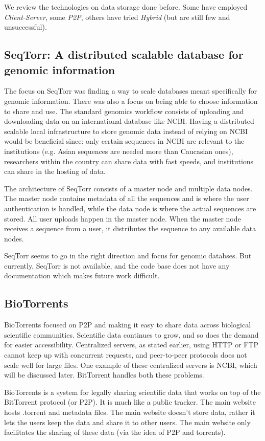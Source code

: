 \documentclass[acmsmall]{acmart}
\begin{document}
We review the technologies on data storage done before. Some have employed \textit{Client-Server}, some \textit{P2P}, others have tried \textit{Hybrid} (but are still few and unsuccessful).

\subsection{SeqTorr: A distributed scalable database for genomic information}
The focus on SeqTorr was finding a way to scale databases meant specifically for genomic information. There was also a focus on being able to choose information to share and use. The standard genomics workflow consists of uploading and downloading data on an international database like NCBI. Having a distributed scalable local infrastructure to store genomic data instead of relying on NCBI would be beneficial since: only certain sequences in NCBI are relevant to the institutions (e.g. Asian sequences are needed more than Caucasian ones), researchers within the country can share data with fast speeds, and  institutions can share in the hosting of data.

The architecture of SeqTorr consists of a master node and multiple data nodes. The master node contains metadata of all the sequences and is where the user authentication is handled, while the data node is where the actual sequences are stored. All user uploads happen in the master node. When the master node receives a sequence from a user, it distributes the sequence to any available data nodes. 
\cite{seqtorr}

SeqTorr seems to go in the right direction and focus for genomic databses. But currently, SeqTorr is not available, and the code base does not have any documentation which makes future work difficult.

\subsection{BioTorrents}
BioTorrents focused on P2P and making it easy to share data across biological scientific communities.  Scientific data continues to grow, and so does the demand for easier accessibility. Centralized servers, as stated earlier, using HTTP or FTP cannot keep up with concurrent requests, and peer-to-peer protocols does not scale well for large files.\cite{biotorrents} One example of these centralized servers is NCBI, which will be discussed later. BitTorrent handles both these problems. 

BioTorrents is a system for legally sharing scientific data that works on top of the BitTorrent protocol (or P2P). It is much like a public tracker. The main website hosts .torrent and metadata files. The main website doesn't store data, rather it lets the users keep the data and share it to other users. The main website only facilitates the sharing of these data (via the idea of P2P and torrents).
\end{document}
